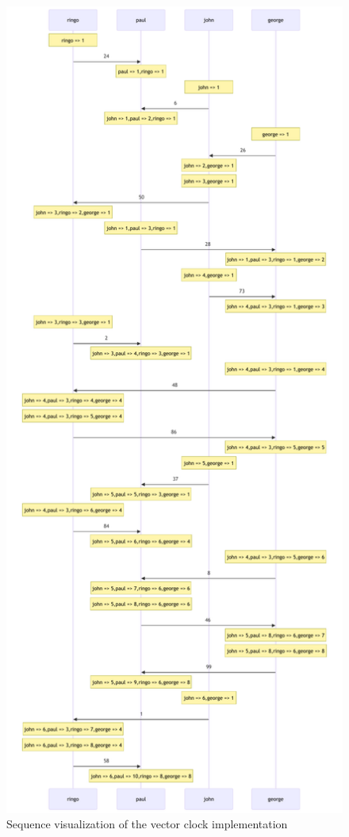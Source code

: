 \documentclass[a4paper, 11pt]{article}
\begin{document}
\begin{figure}[H]
  \begin{center}
    \includegraphics[height=0.985\textheight]{graphics/mermaid_vector.pdf}
    \caption{Sequence visualization of the vector clock implementation}
    \label{fig:seq2}
  \end{center}
\end{figure}
\end{document}
